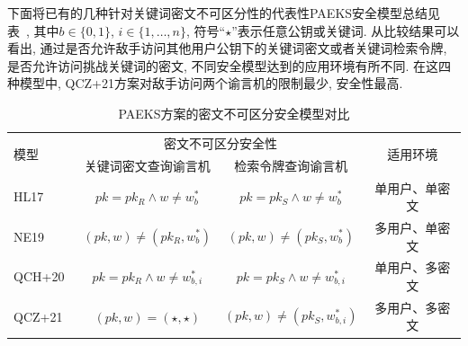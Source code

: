 下面将已有的几种针对关键词密文不可区分性的代表性PAEKS安全模型总结见表~\cite{table:ch6-PAEKS-CI}, 其中$b \in \{0,1\}$, $i \in \{1, \ldots, n\}$, 符号``$\star$''表示任意公钥或关键词. 从比较结果可以看出, 通过是否允许敌手访问其他用户公钥下的关键词密文或者关键词检索令牌, 是否允许访问挑战关键词的密文, 不同安全模型达到的应用环境有所不同. 在这四种模型中, QCZ+21方案对敌手访问两个谕言机的限制最少, 安全性最高. 
\begin{table}[!h]
\caption{PAEKS方案的密文不可区分安全模型对比}\label{table:ch6-PAEKS-CI}
\begin{tabular*}{\textwidth}{@{\extracolsep{\fill}}lccc}
\hline
\multirow{2}{*}{模型} & \multicolumn{2}{c}{密文不可区分安全性} & \multirow{2}{*}{适用环境}\\
\cmidrule(r){2-3}
    & 关键词密文查询谕言机 & 检索令牌查询谕言机 \\
\hline
HL17~\cite{HL-InfSci-2017}
& $pk=pk_R\land w\neq w_b^*$ & $pk=pk_S\land w\neq w_b^*$ & 单用户、单密文\\
NE19~\cite{NE-IET-InfS-2019}  
& $(pk, w)\neq (pk_R, w_b^*)$ & $(pk, w)\neq (pk_S, w_b^*)$  & 多用户、单密文\\ 
QCH+20~\cite{Qin-Information-Science-2020}  & $pk=pk_R\land w\neq w_{b,i}^*$ & $pk=pk_S\land w\neq w_{b,i}^*$ & 单用户、多密文\\ 
QCZ+21~\cite{QCZZ-ProvSec-2021} 
& $(pk, w)=(\star,\star)$ & $(pk, w)\neq (pk_S, w_{b,i}^*)$ & 多用户、多密文\\
\hline
\end{tabular*}
\end{table}

